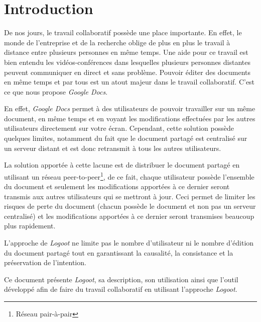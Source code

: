 \chapter*{Introduction}

De nos jours, le travail collaboratif possède une place importante. En effet, le
monde de l'entreprise et de la recherche oblige de plus en plus le travail à
distance entre plusieurs personnes en même temps. Une aide pour ce travail est
bien entendu les vidéos-conférences dans lesquelles plusieurs personnes
distantes peuvent communiquer en direct et sans problème. Pouvoir éditer des
documents en même temps et par tous est un atout majeur dans le travail
collaboratif. C'est ce que nous propose \emph{Google Docs}.

En effet, \emph{Google Docs} permet à des utilisateurs de pouvoir travailler sur
un même document, en même temps et en voyant les modifications effectuées par
les autres utilisateurs directement sur votre écran. Cependant, cette solution
possède quelques limites, notamment du fait que le document partagé est
centralisé sur un serveur distant et est donc retransmit à tous les autres
utilisateurs.

La solution apportée à cette lacune est de distribuer le document partagé en
utilisant un réseau peer-to-peer\footnote{Réseau pair-à-pair}, de ce
fait, chaque utilisateur possède l'ensemble du document et seulement les
modifications apportées à ce dernier seront transmis aux autres utilisateurs qui
se mettront à jour. Ceci permet de limiter les risques de perte du document
(chacun possède le document et non pas un serveur centralisé) et les
modifications apportées à ce dernier seront transmises beaucoup plus rapidement.

L'approche de \emph{Logoot} ne limite pas le nombre d'utilisateur ni le nombre
d'édition du document partagé tout en garantissant la causalité, la consistance
et la préservation de l'intention.

Ce document présente \emph{Logoot}, sa description, son utilisation ainsi que
l'outil développé afin de faire du travail collaboratif en utilisant l'approche
\emph{Logoot}.